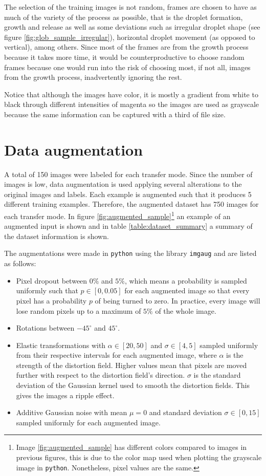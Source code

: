 The selection of the training images is not random, frames are chosen to have as much of the variety of the process as possible, that is the droplet formation, growth and release as well as some deviations such as irregular droplet shape (see figure \ref{fig:glob_sample_irregular}), horizontal droplet movement (as opposed to vertical), among others. Since most of the frames are from the growth process because it takes more time, it would be counterproductive to choose random frames because one would run into the risk of choosing most, if not all, images from the growth process, inadvertently ignoring the rest.

Notice that although the images have color, it is mostly a gradient from white to black through different intensities of magenta so the images are used as grayscale because the same information can be captured with a third of file size.

\section{Data augmentation}
A total of 150 images were labeled for each transfer mode. Since the number of images is low, data augmentation is used applying several alterations to the original images and labels. Each example is augmented such that it produces 5 different training examples. Therefore, the augmented dataset has 750 images for each transfer mode. In figure \ref{fig:augmented_sample}\footnote{Image \ref{fig:augmented_sample} has different colors compared to images in previous figures, this is due to the color map used when plotting the grayscale image in \texttt{python}. Nonetheless, pixel values are the same.} an example of an augmented input is shown and in table \ref{table:dataset_summary} a summary of the dataset information is shown.

The augmentations were made in \texttt{python} using the library \texttt{imgaug} and are listed as follows: 
\begin{itemize}
    \item Pixel dropout between $0\%$ and $5\%$, which means a probability is sampled uniformly such that $p \in [0, 0.05]$ for each augmented image so that every pixel has a probability $p$ of being turned to zero. In practice, every image will lose random pixels up to a maximum of $5\%$ of the whole image.
    \item Rotations between $-45^\circ$ and $45^\circ$.
    \item Elastic transformations with $\alpha \in [20, 50]$ and $\sigma\in [4,5]$ sampled uniformly from their respective intervals for each augmented image, where $\alpha$ is the strength of the distortion field. Higher values mean that pixels are moved further with respect to the distortion field's direction. $\sigma$ is the standard deviation of the Gaussian kernel used to smooth the distortion  
    fields. This gives the images a ripple effect.
    \item Additive Gaussian noise with mean $\mu=0$ and standard deviation $\sigma\in[0,15]$ sampled uniformly for each augmented image.
\end{itemize}

